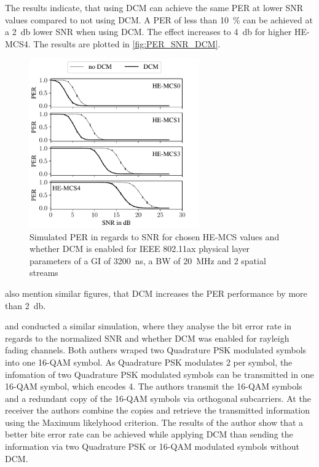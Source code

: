The results indicate, that using \ac{DCM} can achieve the same \ac{PER} at lower \ac{SNR} values compared to not using \ac{DCM}. A \ac{PER} of less than \SI{10}{\percent} can be achieved at
a \SI{2}{\decibel} lower \ac{SNR} when using \ac{DCM}.
The effect increases to \SI{4}{\decibel} for higher HE-\ac{MCS}\num{4}.
The results are plotted in \autoref{fig:PER_SNR_DCM}.
\begin{figure}[H]%
	\centering
	\includegraphics[width=0.65\textwidth]{figures/DCM_PER_to_SNR.pdf}
	\caption{Simulated \ac{PER} in regards to \ac{SNR} for chosen HE-\ac{MCS} values and whether \ac{DCM} is enabled for IEEE 802.11ax physical layer parameters of a \ac{GI} of \SI{3200}{\nano\second}, a \ac{BW} of \SI{20}{\mega\hertz} and 2 spatial streams}%
	\label{fig:PER_SNR_DCM}%
\end{figure}

\textcite{khorov_ieee_2015} also mention similar figures, that \ac{DCM} increases the \ac{PER} performance by more than \SI{2}{\decibel}.

\textcite{ryu_ber_2010} and \textcite{park_ber_2006} conducted a similar simulation, where they analyse the bit error rate in
regards to the normalized \ac{SNR} and whether \ac{DCM} was enabled for rayleigh fading channels.
Both authers wraped two Quadrature \ac{PSK} modulated symbols into one 16-\ac{QAM} symbol.
As Quadrature \ac{PSK} modulates \SI{2}{\bit} per symbol, the infomation of two Quadrature \ac{PSK} modulated symbols can be
transmitted in one 16-\ac{QAM} symbol, which encodes \SI{4}{\bit}.
The authors transmit the 16-\ac{QAM} symbols and a redundant copy
of the 16-\ac{QAM} symbols via orthogonal subcarriers. At the receiver the authors combine the copies and retrieve the transmitted
information using the Maximum likelyhood criterion. The results of the author show that a better bite error rate can be achieved while applying
\ac{DCM} than sending the information via two Quadrature \ac{PSK} or 16-\ac{QAM} modulated symbols without \ac{DCM}.



